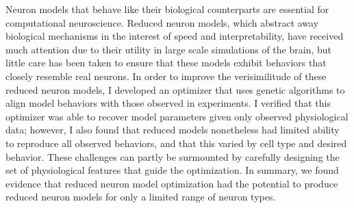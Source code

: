 
\hspace*{\parindent} 
Neuron models that behave like their biological counterparts are essential for computational neuroscience.
Reduced neuron models, which abstract away biological mechanisms in the interest of speed and interpretability, have received much attention due to their utility in large scale simulations of the brain, but little care has been taken to ensure that these models exhibit behaviors that closely resemble real neurons.
In order to improve the verisimilitude of these reduced neuron models, I developed an optimizer that uses genetic algorithms to align model behaviors with those observed in experiments.
I verified that this optimizer was able to recover model parameters given only observed physiological data; however, I also found that reduced models nonetheless had limited ability to reproduce all observed behaviors, and that this varied by cell type and desired behavior.
These challenges can partly be surmounted by carefully designing the set of physiological features that guide the optimization. In summary, we found evidence that reduced neuron model optimization had the potential to produce reduced neuron models for only a limited range of neuron types.










